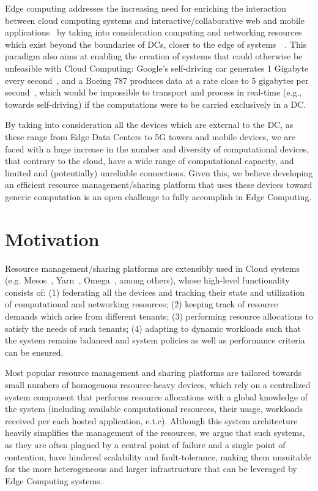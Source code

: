 Edge computing addresses the increasing need for enriching the interaction between cloud computing systems and interactive/collaborative web and mobile applications~\cite{10.1145/242857.242867} by taking into consideration computing and networking resources which exist beyond the boundaries of DCs, closer to the edge of systems~\cite{Leitao2018}~\cite{7488250}. This paradigm also aims at enabling the creation of systems that could otherwise be unfeasible with Cloud Computing: Google's self-driving car generates 1 Gigabyte every second~\cite{datafloq}, and a Boeing 787 produces data at a rate close to 5 gigabytes per second~\cite{finnegan_2013}, which would be impossible to transport and process in real-time (e.g., towards self-driving) if the computations were to be carried exclusively in a DC.

By taking into consideration all the devices which are external to the DC, as these range from Edge Data Centers to 5G towers and mobile devices, we are faced with a huge increase in the number and diversity of computational devices, that contrary to the cloud, have a wide range of computational capacity, and limited and (potentially) unreliable connections. Given this, we believe developing an efficient resource management/sharing platform that uses these devices toward generic computation is an open challenge to fully accomplish in Edge Computing.

\section{Motivation}

Resource management/sharing platforms are extensibly used in Cloud systems (e.g. Mesos~\cite{hindman2011mesos}, Yarn~\cite{Vavilapalli2013ApacheHY}, Omega~\cite{41684}, among others), whose high-level functionality consists of: (1) federating all the devices and tracking their state and utilization of computational and networking resources; (2) keeping track of resource demands which arise from different tenants; (3) performing resource allocations to satisfy the needs of such tenants; (4) adapting to dynamic workloads such that the system remains balanced and system policies as well as performance criteria can be ensured.

Most popular resource management and sharing platforms are tailored towards small numbers of homogenous resource-heavy devices, which rely on a centralized system component that performs resource allocations with a global knowledge of the system (including available computational resources, their usage, workloads received per each hosted application, e.t.c). Although this system architecture heavily simplifies the management of the resources, we argue that such systems, as they are often plagued by a central point of failure and a single point of contention, have hindered scalability and fault-tolerance, making them unsuitable for the more heterogeneous and larger infrastructure that can be leveraged by Edge Computing systems. 

